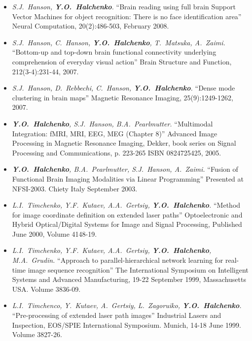 \documentclass[12pt,overlapped,line]{res}
\newcommand{\mtitle}[1]{``#1''}
\newcommand{\mauthors}[1]{ \textit{#1.}}
\newcommand{\mwhere}[1]{#1.}
\begin{document}
\begin{resume}
\begin{itemize}
  \item
    \mauthors{S.J.~Hanson, \textbf{Y.O.~Halchenko}}
    \mtitle{Brain reading using full brain Support Vector Machines for
      object recognition: There is no face identification area}
    \mwhere{Neural Computation, 20(2):486-503, February 2008}

  \item
    \mauthors{S.J.~Hanson, C.~Hanson, \textbf{Y.O.~Halchenko}, T.~Matsuka, A.~Zaimi}
    \mtitle{Bottom-up and top-down brain functional connectivity underlying comprehension of everyday visual action}
    \mwhere{Brain Structure and Function, 212(3-4):231-44, 2007}

  \item
    \mauthors{S.J.~Hanson, D.~Rebbechi, C.~Hanson, \textbf{Y.O.~Halchenko}}
    \mtitle{Dense mode clustering in brain maps}
    \mwhere{Magnetic Resonance Imaging, 25(9):1249-1262, 2007}

  \item
    \mauthors{\textbf{Y.O.~Halchenko}, S.J.~Hanson, B.A.~Pearlmutter}
    \mtitle{Multimodal Integration: fMRI, MRI, EEG, MEG (Chapter 8)}
    \mwhere{Advanced Image Processing in Magnetic Resonance Imaging,
      Dekker, book series on Signal Processing and Communications, p. 223-265
      ISBN 0824725425, 2005}

  \item
     \mauthors{\textbf{Y.O.~Halchenko}, B.A.~Pearlmutter, S.J.~Hanson, A.~Zaimi}
     \mtitle{Fusion of Functional Brain Imaging Modalities via Linear Programming}
     \mwhere{Presented at NFSI-2003. Chiety Italy September 2003}

  \item
     \mauthors{L.I.~Timchenko, Y.F.~Kutaev, A.A.~Gertsiy, \textbf{Y.O.~Halchenko}}
     \mtitle{Method for image coordinate definition on extended laser paths}
     \mwhere{Optoelectronic and Hybrid Optical/Digital Systems for Image and Signal Processing, Published June 2000,  Volume 4148-19}

  \item
     \mauthors{L.I.~Timchenko, Y.F.~Kutaev, A.A.~Gertsiy, \textbf{Y.O.~Halchenko},
     M.A.~Grudin}
     \mtitle{Approach to parallel-hierarchical network learning for real-time image sequence recognition}
     \mwhere{The International Symposium on Intelligent Systems and Advanced Manufacturing, 19-22 September 1999, Massachusetts USA. Volume 3836-09}

   \item
     \mauthors{L.I.~Timchenco, Y.~Kutaev, A.~Gertsiy, L.~Zagoruiko, \textbf{Y.O.~Halchenko}}
     \mtitle{Pre-processing of extended laser path images}
     \mwhere{Industrial Lasers and Inspection, EOS/SPIE International Symposium. Munich, 14-18 June 1999. Volume 3827-26}


\end{itemize}
\end{resume}
\end{document}
